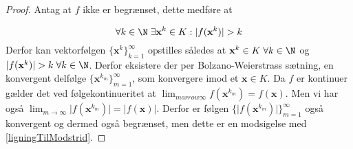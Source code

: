 \begin{proof}
Antag at $f$ ikke er begrænset, dette medføre at

\begin{equation}\label{ligningTilModstrid}
    \forall k \in \N\; \exists \mathbf{x}^k \in K : \lvert f(\mathbf{x}^k) \rvert > k
\end{equation}
Derfor kan vektorfølgen $\{\mathbf{x}^k\}^\infty_{k=1}$ opstilles således at 
$\mathbf{x}^k \in K \; \forall k \in \N$ og 
$\lvert f(\mathbf{x}^k) \rvert > k \; \forall k \in \N$. 
Derfor eksistere der per Bolzano-Weierstrass sætning, en konvergent delfølge 
$\{\mathbf{x}^{k_m}\}_{m=1}^\infty$, som konvergere imod et $\mathbf{x} \in K$. 
Da $f$ er kontinuer gælder det ved følgekontinueritet at 
$\lim_{marrow \infty} f(\mathbf{x}^{k_m}) = f(\mathbf{x})$. 
Men vi har også 
$\lim_{m \rightarrow \infty} \lvert f(\mathbf{x}^{k_m}) \rvert = \lvert f(\mathbf{x}) \rvert$. 
Derfor er følgen $\{\lvert f(\mathbf{x}^{k_m})\rvert\}^\infty_{m = 1}$ også konvergent og dermed også begrænset, 
men dette er en modsigelse med \eqref{ligningTilModstrid}. 
\end{proof}